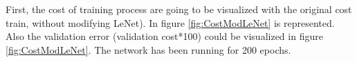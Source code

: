 
First, the cost of training process are going to be visualized with the original cost train, without modifying LeNet). In figure \ref{fig:CostModLeNet} is represented. Also the validation error (validation cost*100) could be visualized in figure \ref{fig:CostModLeNet}. The network has been running for 200 epochs.\\

\begin{figure}[htb]    \centering

\end{figure}

